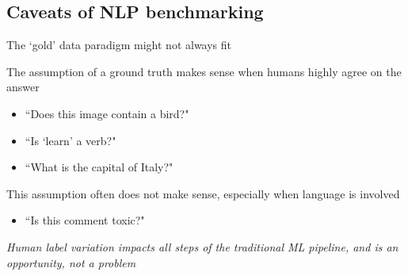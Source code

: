 \documentclass[12pt,aspectratio=169,handout]{beamer}
\begin{document}
\subsection{Caveats of NLP benchmarking}


\begin{frame}{The `gold' data paradigm might not always fit}

The assumption of a ground truth makes sense when humans highly agree on the answer

\begin{itemize}
	\item ``Does this image contain a bird?"
	\item ``Is `learn' a verb?"
	\item ``What is the capital of Italy?"
\end{itemize}

This assumption often does not make sense, especially when language is involved

\begin{itemize}
	\item ``Is this comment toxic?"
\end{itemize}

\emph{Human label variation impacts all steps of the traditional ML pipeline, and is an opportunity, not a problem}


\end{frame}

%
%
%
%
%
%
%
%
%
%
%
\end{document}
